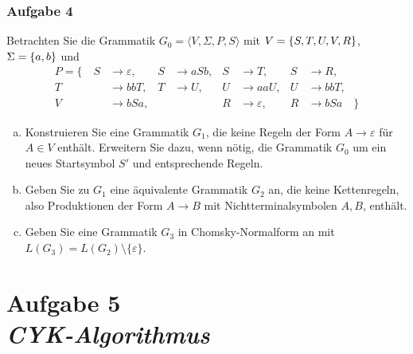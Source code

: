 \documentclass{beamer}
\newcommand{\tuple}[1]{\langle{#1}\rangle}
\begin{document}
	
	\begin{frame} \frametitle{Aufgabe 4}
		\small
		Betrachten Sie die Grammatik
		$G_0 = \tuple{V, \Sigma, P, S}$ mit $V = \left\{ S, T, U, V, R \right\}$, $\Sigma = \left\{ a,b \right\}$ und
		\begin{align*}
			P = \{ \quad 
			S &\to \varepsilon, & S &\to aSb, & S &\to T, & S &\to R, \\
			T &\to bbT, & T &\to U, & U &\to aaU, & U &\to bb T, \\
			V &\to bSa, &   &       & R &\to \varepsilon, & R &\to bSa \quad \}
		\end{align*}
		\vspace{-\baselineskip}
		\begin{enumerate}[a)]
			\item Konstruieren Sie eine Grammatik $G_1$, die
			keine Regeln der Form $A \to \varepsilon$ für $A\in V$ enthält.
			Erweitern Sie dazu, wenn nötig, die Grammatik $G_0$ um ein neues
			Startsymbol $S'$ und entsprechende Regeln.
			\item Geben Sie zu $G_1$ eine äquivalente Grammatik $G_2$ an, die
			keine Kettenregeln, also Produktionen der Form $A \to B$ mit
			Nichtterminalsymbolen $A,B$, enthält. 
			\item Geben Sie eine Grammatik $G_3$ in
			Chomsky-Normalform an mit $L(G_3) = L(G_2) \setminus \{\varepsilon\}$.
		\end{enumerate}
	\end{frame}

	\section{Aufgabe 5 \\ \itshape CYK-Algorithmus}
	
	\newcommand{\Rightarrowstarquest}{\mathrel{{\stackrel{?}{\Rightarrow}}{}^\ast}}
\end{document}
